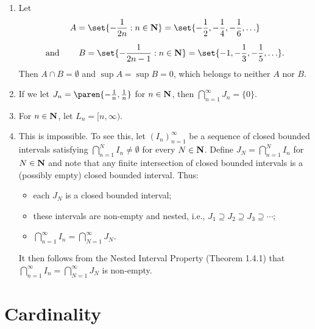 \documentclass{lew98_solutions}
\begin{document}
\begin{solution}
    \begin{enumerate}
        \item Let
        \begin{multline*}
            A = \set{ -\frac{1}{2n} : n \in \N } = \set{ -\frac{1}{2}, -\frac{1}{4}, -\frac{1}{6}, \ldots } \\[2mm]
            \text{and} \hspace{8mm} B = \set{ -\frac{1}{2n - 1} : n \in \N } = \set{ -1, -\frac{1}{3}, -\frac{1}{5}, \ldots }.
        \end{multline*}
        Then \( A \cap B = \emptyset \) and \( \sup A = \sup B = 0 \), which belongs to neither \( A \) nor \( B \).

        \item If we let \( J_n = \paren{-\tfrac{1}{n}, \tfrac{1}{n}} \) for \( n \in \mathbf{N} \), then \( \bigcap_{n=1}^{\infty} J_n = \{ 0 \} \).

        \item For \( n \in \mathbf{N} \), let \( L_n = [n, \infty) \).

        \item This is impossible. To see this, let \( (I_n)_{n=1}^{\infty} \) be a sequence of closed bounded intervals satisfying \( \bigcap_{n=1}^N I_n \neq \emptyset \) for every \( N \in \mathbf{N} \). Define \( J_N = \bigcap_{n=1}^N I_n \) for \( N \in \mathbf{N} \) and note that any finite intersection of closed bounded intervals is a (possibly empty) closed bounded interval. Thus:
        \begin{itemize}
            \item each \( J_N \) is a closed bounded interval;

            \item these intervals are non-empty and nested, i.e., \( J_1 \supseteq J_2 \supseteq J_3 \supseteq \cdots \);

            \item \( \bigcap_{n=1}^{\infty} I_n = \bigcap_{N=1}^{\infty} J_N \).
        \end{itemize}
        It then follows from the Nested Interval Property (Theorem 1.4.1) that \( \bigcap_{n=1}^{\infty} I_n = \bigcap_{N=1}^{\infty} J_N \) is non-empty.
    \end{enumerate}
\end{solution}

\section{Cardinality}
\label{sec:1.5}
\end{document}
